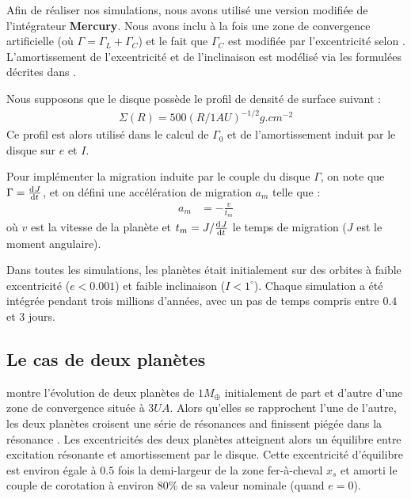 \bigskip

Afin de réaliser nos simulations, nous avons utilisé une version modifiée de l'intégrateur \textbf{Mercury}\citep{chambers1999hybrid}. Nous avons inclu à la fois une zone de convergence artificielle (où $\Gamma = \Gamma_L+\Gamma_C$) et le fait que $\Gamma_C$ est modifiée par l'excentricité selon . L'amortissement de l'excentricité et de l'inclinaison est modélisé via les formulées décrites dans \cite{cresswell2008three}. 

Nous supposons que le disque possède le profil de densité de surface suivant :
\begin{align}
\Sigma(R) = 500 \left(R/1\unit{AU}\right)^{-1/2} \unit{g.cm^{-2}}
\end{align}
Ce profil est alors utilisé dans le calcul de $\Gamma_0$ et de l'amortissement induit par le disque sur $e$ et $I$.

Pour implémenter la migration induite par le couple du disque $\Gamma$, on note que $\Gamma=\od{J}{t}$, et on défini une accélération de migration $a_m$ telle que\citep[eq. (14)]{cresswell2008three} :
\begin{align}
a_m &= - \frac{v}{t_m}
\end{align}
où $v$ est la vitesse de la planète et $t_m=J/\od{J}{t}$ le temps de migration ($J$ est le moment angulaire).

\bigskip

Dans toutes les simulations, les planètes était initialement sur des orbites à faible excentricité ($e<0.001$) et faible inclinaison ($I<1^\circ$). Chaque simulation a été intégrée pendant trois millions d'années, avec un pas de temps compris entre $0.4$ et $3$ jours.

\subsection{Le cas de deux planètes}
 montre l'évolution de deux planètes de $1\unit{M_\oplus}$ initialement de part et d'autre d'une zone de convergence située à $3\unit{UA}$. Alors qu'elles se rapprochent l'une de l'autre, les deux planètes croisent une série de résonances and finissent piégée dans la résonance . Les excentricités des deux planètes atteignent alors un équilibre entre excitation résonante et amortissement par le disque. Cette excentricité d'équilibre est environ égale à $0.5$ fois la demi-largeur de la zone fer-à-cheval $x_s$ et amorti le couple de corotation à environ $80\%$ de sa valeur nominale (quand $e=0$). 

